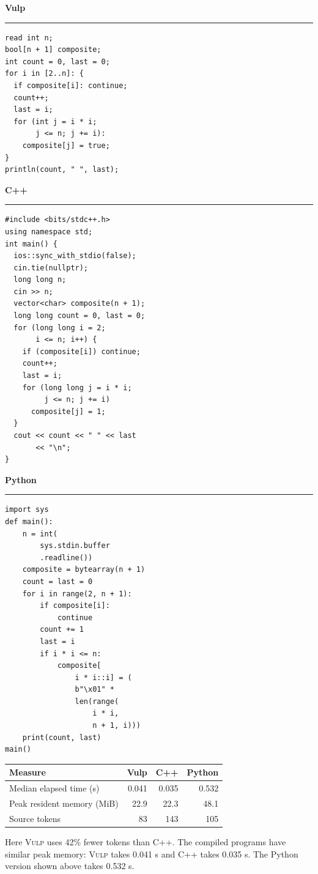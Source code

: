 \documentclass[12pt,a4paper]{report}
\newcommand{\vulp}{\textsc{Vulp}}
\begin{document}
\noindent\begin{minipage}[t]{0.315\textwidth}
\small\textbf{Vulp}\par\hrule\scriptsize
\begin{verbatim}
read int n;
bool[n + 1] composite;
int count = 0, last = 0;
for i in [2..n]: {
  if composite[i]: continue;
  count++;
  last = i;
  for (int j = i * i;
       j <= n; j += i):
    composite[j] = true;
}
println(count, " ", last);
\end{verbatim}
\end{minipage}\hfill
\begin{minipage}[t]{0.315\textwidth}
\small\textbf{C++}\par\hrule\scriptsize
\begin{verbatim}
#include <bits/stdc++.h>
using namespace std;
int main() {
  ios::sync_with_stdio(false);
  cin.tie(nullptr);
  long long n;
  cin >> n;
  vector<char> composite(n + 1);
  long long count = 0, last = 0;
  for (long long i = 2;
       i <= n; i++) {
    if (composite[i]) continue;
    count++;
    last = i;
    for (long long j = i * i;
         j <= n; j += i)
      composite[j] = 1;
  }
  cout << count << " " << last
       << "\n";
}
\end{verbatim}
\end{minipage}\hfill
\begin{minipage}[t]{0.315\textwidth}
\small\textbf{Python}\par\hrule\scriptsize
\begin{verbatim}
import sys
def main():
    n = int(
        sys.stdin.buffer
        .readline())
    composite = bytearray(n + 1)
    count = last = 0
    for i in range(2, n + 1):
        if composite[i]:
            continue
        count += 1
        last = i
        if i * i <= n:
            composite[
                i * i::i] = (
                b"\x01" *
                len(range(
                    i * i,
                    n + 1, i)))
    print(count, last)
main()
\end{verbatim}
\end{minipage}

\begin{center}\small
\begin{tabular}{|l|r|r|r|}
\hline
Measure & Vulp & C++ & Python\\\hline
Median elapsed time (s) & 0.041 & 0.035 & 0.532\\\hline
Peak resident memory (MiB) & 22.9 & 22.3 & 48.1\\\hline
Source tokens & 83 & 143 & 105\\\hline
\end{tabular}
\end{center}
\noindent Here \vulp{} uses 42\% fewer tokens than C++. The compiled programs have similar peak memory: \vulp{} takes 0.041 s and C++ takes 0.035 s. The Python version shown above takes 0.532 s.
\end{document}
